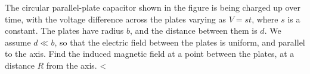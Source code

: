 The circular parallel-plate capacitor shown in the figure is being charged
        up over time, with the voltage difference across the plates varying as
        $V=st$, where $s$ is a constant. The plates have radius $b$, and the distance
        between them is $d$. We assume $d \ll b$, so that the electric field between
        the plates is uniform, and parallel to the axis. Find the induced magnetic
        field at a point between the plates, at a distance $R$ from the axis.
        <%
